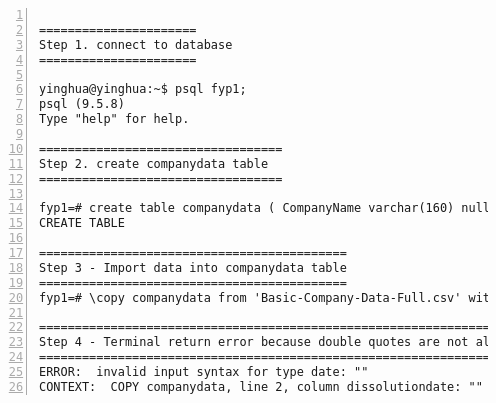 \lstset{basicstyle=\ttfamily\tiny} 
\begin{lstlisting}[breaklines, frame=single, numbers=left, caption={Identify correctness of data types}, label=commandline-02]

======================
Step 1. connect to database
======================

yinghua@yinghua:~$ psql fyp1;
psql (9.5.8)
Type "help" for help.

==================================
Step 2. create companydata table
==================================

fyp1=# create table companydata ( CompanyName varchar(160) null default null, CompanyNumber varchar(8) not null primary key, CareOf varchar(100) null, POBOX varchar(10) null, AddressLine1 varchar(300) null, AddressLine2 varchar(300) null, PostTown varchar(50) null, County varchar(50) null, Country varchar(50) null, PostCode varchar(20) null, CompanyCategory varchar(100) not null, CompanyStatus varchar(70) not null, CountryOfOrigin varchar(50) not null, DissolutionDate date null default null, IncorporationDate date null default null, AccountingRefDay int null, AccountingRefMonth int null default 0, Account_NextDueDate date null default null, Account_LastMadeUpdate date null default null, AccountCategory varchar(30) null, Return_NextDueDate date null default null, Return_LastMadeUpDate date null default null, NumMortChanges int null, NumMortOutstanding int null, NumMortPartSatisfied int null, NumMortSatisfied int null, SICCode1 varchar(170) null, SICCode2 varchar(170) null, SICCode3 varchar(170) null, SICCode4 varchar(170) null, NumGenPartners int not null, NumLimPartners int not null, URI varchar(47) not null, pn1_CONDate date null default null, pn1_CompanyName varchar(160) null, pn2_CONDate date null default null, pn2_CompanyName varchar(160) null, pn3_CONDate date null default null, pn3_CompanyName varchar(160) null, pn4_CONDate date null default null, pn4_CompanyName varchar(160) null, pn5_CONDate date null default null, pn5_CompanyName varchar(160) null, pn6_CONDate date null default null, pn6_CompanyName varchar(160) null, pn7_CONDate date null default null, pn7_CompanyName varchar(160) null, pn8_CONDate date null default null, pn8_CompanyName varchar(160) null, pn9_CONDate date null default null, pn9_CompanyName varchar(160) null, pn10_CONDate date null default null, pn10_CompanyName varchar(160) null, ConfStmtNextDueDate date null default null, ConfStmtLastMadeUpDate date null default null);
CREATE TABLE

===========================================
Step 3 - Import data into companydata table
===========================================
fyp1=# \copy companydata from 'Basic-Company-Data-Full.csv' with header csv;

=================================================================================
Step 4 - Terminal return error because double quotes are not allow to insert into date datatypes. 
=================================================================================
ERROR:  invalid input syntax for type date: ""
CONTEXT:  COPY companydata, line 2, column dissolutiondate: ""

\end{lstlisting}

